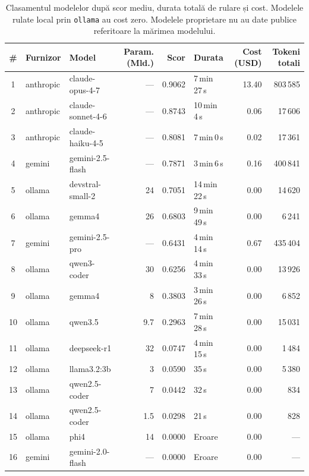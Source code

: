 \documentclass[12pt, a4paper, oneside, romanian]{teza-upb}
\begin{document}
  \begin{table}[H]
    \centering
    \scriptsize
    \setlength{\tabcolsep}{3pt}
    \renewcommand{\arraystretch}{1.0}
    \begin{tabular}{@{}cllrrlrr@{}}
      \toprule
      \textbf{\#} & \textbf{Furnizor} & \textbf{Model} & \textbf{Param. (Mld.)} & \textbf{Scor} & \textbf{Durata} & \textbf{Cost (USD)} & \textbf{Tokeni totali} \\
      \midrule
      1  & anthropic & claude-opus-4-7          & ---  & 0.9062 & 7\,min\,27\,s  & 13.40 & 803\,585 \\
      2  & anthropic & claude-sonnet-4-6        & ---  & 0.8743 & 10\,min\,4\,s  & 0.06  & 17\,606  \\
      3  & anthropic & claude-haiku-4-5         & ---  & 0.8081 & 7\,min\,0\,s   & 0.02  & 17\,361  \\
      4  & gemini    & gemini-2.5-flash         & ---  & 0.7871 & 3\,min\,6\,s   & 0.16  & 400\,841 \\
      5  & ollama    & devstral-small-2     & 24   & 0.7051 & 14\,min\,22\,s & 0.00  & 14\,620  \\
      6  & ollama    & gemma4               & 26   & 0.6803 & 9\,min\,49\,s  & 0.00  & 6\,241   \\
      7  & gemini    & gemini-2.5-pro           & ---  & 0.6431 & 4\,min\,14\,s  & 0.67  & 435\,404 \\
      8  & ollama    & qwen3-coder          & 30   & 0.6256 & 4\,min\,33\,s  & 0.00  & 13\,926  \\
      9  & ollama    & gemma4                & 8    & 0.3803 & 3\,min\,26\,s  & 0.00  & 6\,852   \\
      10 & ollama    & qwen3.5             & 9.7  & 0.2963 & 7\,min\,28\,s  & 0.00  & 15\,031  \\
      11 & ollama    & deepseek-r1          & 32   & 0.0747 & 4\,min\,15\,s  & 0.00  & 1\,484   \\
      12 & ollama    & llama3.2:3b         & 3    & 0.0590 & 35\,s          & 0.00  & 5\,380   \\
      13 & ollama    & qwen2.5-coder         & 7    & 0.0442 & 32\,s          & 0.00  & 834      \\
      14 & ollama    & qwen2.5-coder       & 1.5  & 0.0298 & 21\,s          & 0.00  & 828      \\
      15 & ollama    & phi4                & 14   & 0.0000 & Eroare         & 0.00  & ---      \\
      16 & gemini    & gemini-2.0-flash         & ---  & 0.0000 & Eroare         & 0.00  & ---      \\
      \bottomrule
    \end{tabular}
    \caption{Clasamentul modelelor după scor mediu, durata totală de rulare și cost. Modelele rulate local prin \texttt{ollama} au cost zero. Modelele proprietare nu au date publice referitoare la mărimea modelului.}
    \label{tab:leaderboard}
  \end{table}
\end{document}
